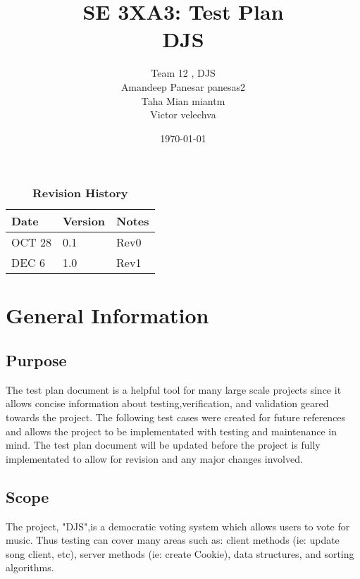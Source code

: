 \documentclass[12pt, titlepage]{article}
\title{SE 3XA3: Test Plan\\DJS}
\author{Team 12 , DJS
		\\ Amandeep Panesar panesas2
		\\ Taha Mian miantm
		\\ Victor velechva
}
\date{\today}
\begin{document}
\newcommand{\acceptableRating}{\textcolor{blue}{7.5 }}
\newcommand{\numberOfSongs}{\textcolor{blue}{5 }}
\newcommand{\numberOfStressTestClients}{\textcolor{blue}{300 }}

\maketitle

\tableofcontents
\listoftables
\listoffigures

\begin{table}[bp]
\caption{\bf Revision History}
\begin{tabularx}{\textwidth}{p{3cm}p{2cm}X}
\toprule {\bf Date} & {\bf Version} & {\bf Notes}\\
\midrule
OCT 28 & 0.1 & Rev0\\
DEC 6 & 1.0 & Rev1\\

\bottomrule
\end{tabularx}
\end{table}

\newpage


\section{General Information}

\subsection{Purpose}
The test plan document is a helpful tool for many large scale projects since it allows concise information about testing,verification, and validation geared towards the project. The following test cases were created for future references and allows the project to be implementated with testing and maintenance in mind. The test plan document will be updated before the project is fully implementated to allow for revision and any major changes involved.

\subsection{Scope}
The project, "DJS",is a democratic voting system which allows users to vote for music. Thus testing can cover many areas such as: client methods (ie: update song client, etc), server methods (ie: create Cookie), data structures, and sorting algorithms. 
\end{document}

